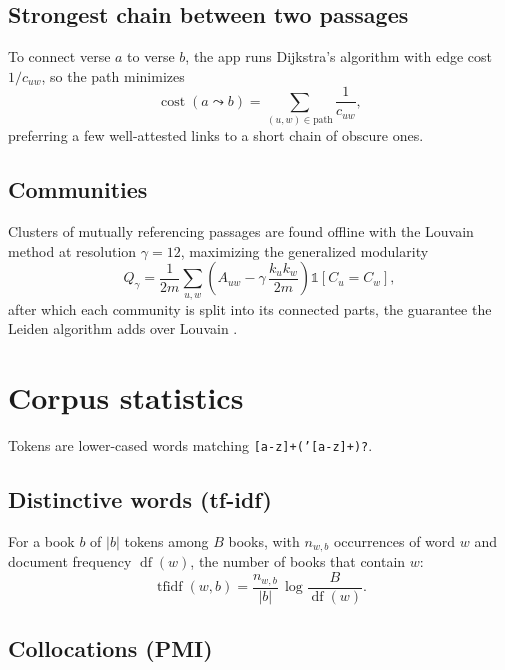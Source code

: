 \documentclass[11pt]{article}
\newcommand{\code}[1]{\texttt{#1}}
\begin{document}
\subsection{Strongest chain between two passages}

To connect verse $a$ to verse $b$, the app runs Dijkstra's algorithm with edge
cost $1/c_{uw}$, so the path minimizes
\begin{equation}
  \operatorname{cost}(a \leadsto b) = \sum_{(u,w) \in \text{path}} \frac{1}{c_{uw}},
\end{equation}
preferring a few well-attested links to a short chain of obscure ones.

\subsection{Communities}

Clusters of mutually referencing passages are found offline with the Louvain
method at resolution $\gamma = 12$, maximizing the generalized modularity
\begin{equation}
  Q_\gamma = \frac{1}{2m}\sum_{u,w}\left(A_{uw} - \gamma\,\frac{k_u k_w}{2m}\right)\mathbb{1}[C_u = C_w],
\end{equation}
after which each community is split into its connected parts, the guarantee
the Leiden algorithm adds over Louvain \cite{leiden}.

\section{Corpus statistics}\label{sec:stats}

Tokens are lower-cased words matching \code{[a-z]+('[a-z]+)?}.

\subsection{Distinctive words (tf-idf)}

For a book $b$ of $|b|$ tokens among $B$ books, with $n_{w,b}$ occurrences of
word $w$ and document frequency $\operatorname{df}(w)$, the number of books that
contain $w$:
\begin{equation}
  \operatorname{tfidf}(w, b) = \frac{n_{w,b}}{|b|}\,\log\frac{B}{\operatorname{df}(w)}.
\end{equation}

\subsection{Collocations (PMI)}
\end{document}
